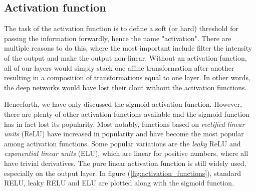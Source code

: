 \subsection{Activation function}
The task of the activation function is to define a soft (or hard) threshold for passing the information forwardly, hence the name "activation". There are multiple reasons to do this, where the most important include filter the intensity of the output and make the output non-linear. Without an activation function, all of our layers would simply stack one affine transformation after another resulting in a composition of transformations equal to one layer. In other words, the deep networks would have lost their clout without the activation functions. 

Henceforth, we have only discussed the sigmoid activation function. However, there are plenty of other activation functions available and the sigmoid function has in fact lost its popularity. Most notably, functions based on \textit{rectified linear units} (ReLU) have increased in popularity and have become the most popular among activation functions. Some popular variations are the \textit{leaky} ReLU and \textit{exponential linear units} (ELU), which are linear for positive numbers, where all have trivial derivatives. The pure linear activation function is still widely used, especially on the output layer. In figure (\ref{fig:activation_functions}), standard RELU, leaky RELU and ELU are plotted along with the sigmoid function.

